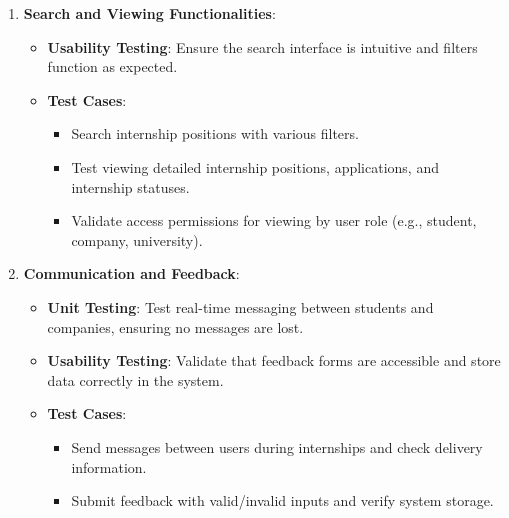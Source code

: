 \begin{enumerate}
        \item \textbf{Search and Viewing Functionalities}:
        \begin{itemize}
            \item \textbf{Usability Testing}: 
            Ensure the search interface is intuitive and filters function as expected.
            \item \textbf{Test Cases}:
            \begin{itemize}
                \item Search internship positions with various filters.
                \item Test viewing detailed internship positions, applications, and internship statuses.
                \item Validate access permissions for viewing by user role (e.g., student, company, university).
            \end{itemize}
        \end{itemize}
    
        \item \textbf{Communication and Feedback}:
        \begin{itemize}
            \item \textbf{Unit Testing}: 
            Test real-time messaging between students and companies, ensuring no messages are lost.
            \item \textbf{Usability Testing}: 
            Validate that feedback forms are accessible and store data correctly in the system.
            \item \textbf{Test Cases}:
            \begin{itemize}
                \item Send messages between users during internships and check delivery information.
                \item Submit feedback with valid/invalid inputs and verify system storage.
            \end{itemize}
        \end{itemize}
    

\end{enumerate}
